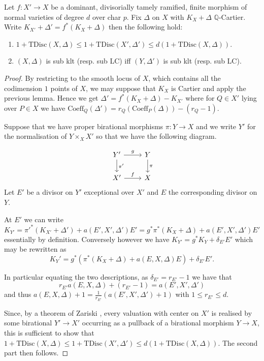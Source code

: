 \begin{lemma}\cite[Proposition 3.16]{kollar1997singularities} \label{finite adjunction}
	Let $f\colon X' \to X$ be a dominant, divisorially tamely ramified, finite morphism of normal varieties of degree $d$ over char $p$. Fix $\Delta$ on $X$ with $K_{X}+\Delta$ $\mathbb{Q}$-Cartier. Write $K_{X'}+\Delta'=f^{*}(K_{X}+\Delta)$ then the following hold:
	\begin{enumerate}
		\item $1+\text{TDisc}(X,\Delta) \leq 1+\text{TDisc}(X',\Delta') \leq d(1+\text{TDisc}(X,\Delta))$.
		\item $(X,\Delta)$ is sub klt (resp. sub LC) iff $(Y,\Delta')$ is sub klt (resp. sub LC).
	\end{enumerate}
\end{lemma}

\begin{proof}
	
	By restricting to the smooth locus of $X$, which contains all the codimension $1$ points of $X$, we may suppose that $K_{X}$ is Cartier and apply the previous lemma. Hence we get $\Delta'=f^{*}(K_{X}+\Delta)-K_{X'}$ where for $Q\in X'$ lying over $P\in X$ we have $\text{Coeff}_{Q}(\Delta')=r_{Q}(\text{Coeff}_{P}(\Delta))-(r_{Q}-1)$.
	
	Suppose that we have proper birational morphisms $\pi\colon Y \to X$ and we write $Y'$ for the normalisation of $Y\times_{X} X'$ so that we have the following diagram.
	
	\[\begin{tikzcd}
	Y' \arrow[d, "\pi'"] \arrow[r, "g"] & Y \arrow[d, "\pi"] \\
	X' \arrow[r, "f"]                   & X                 
	\end{tikzcd}\]
	Let $E'$ be a divisor on $Y'$ exceptional over $X'$ and $E$ the corresponding divisor on $Y$.
	
	At $E'$ we can write $$K_{Y'}= \pi'^{*}(K_{X'}+\Delta')+a(E',X',\Delta')E'=g^{*}\pi^{*}(K_{X}+\Delta)+a(E',X',\Delta')E'$$
	essentially by definition. Conversely however we have $K_{Y'}=g^{*}K_{Y}+\delta_{E'}E'$ which may be rewritten as 
	$$K_{Y}'=g^{*}(\pi^{*}(K_{X}+\Delta)+a(E,X,\Delta)E)+\delta_{E'}E'.$$
	
	In particular equating the two descriptions, as $\delta_{E'}=r_{E'}-1$ we have that
	\[r_{E'}a(E,X,\Delta)+(r_{E'}-1)=a(E',X',\Delta')\]
	and thus $a(E,X,\Delta)+1=\frac{1}{r_{E'}}(a(E',X',\Delta')+1)$ with $1 \leq r_{E'} \leq d$.
	
	Since, by a theorem of Zariski \cite[Theorem VI.1.3]{k-rat-curves}, every valuation with center on $X'$ is realised by some birational $Y' \to X'$ occurring as a pullback of a birational morphism $Y \to X$, this is sufficient to show that $1+\text{TDisc}(X,\Delta) \leq 1+\text{TDisc}(X',\Delta') \leq d(1+\text{TDisc}(X,\Delta))$. The second part then follows.
\end{proof}


